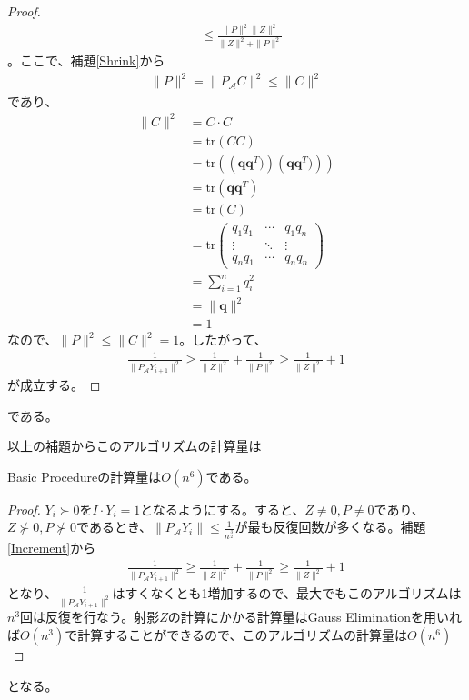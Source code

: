 \begin{proof}
\begin{align*}
                                  & \leq \frac{\|P\|^2 \|Z\|^2}{\|Z\|^2 + \|P\|^2}
  \end{align*}
  。ここで、補題\ref{Shrink}から
  \begin{align*}
    \|P\|^2 = \|P_\mathcal{A} C\|^2 \leq \|C\|^2
  \end{align*}
  であり、
  \begin{align*}
    \|C\|^2 & = C \cdot C \\
            & = \mathrm{tr} \left(C C\right) \\
            & = \mathrm{tr} \left(\left(\mathbf{q} \mathbf{q}^T)\right) \left(\mathbf{q} \mathbf{q}^T)\right)\right) \\
            & = \mathrm{tr} \left(\mathbf{q} \mathbf{q}^T\right) \\
            & = \mathrm{tr} \left(C\right) \\
            & = \mathrm{tr} \left(
                              \begin{array}{ccc}
                                q_1 q_1 & \cdots & q_1 q_n \\
                                \vdots  & \ddots & \vdots \\
                                q_n q_1 & \cdots & q_n q_n
                              \end{array}
                            \right) \\
            & = \displaystyle{\sum_{i = 1}^n} q_i^2 \\
            & = \|\mathbf{q}\|^2 \\
            & = 1
  \end{align*}
  なので、$\|P\|^2 \leq \|C\|^2 = 1$。したがって、
  \begin{align*}
    \frac{1}{\|P_\mathcal{A} Y_{i + 1}\|^2} \geq \frac{1}{\|Z\|^2} + \frac{1}{\|P\|^2} \geq \frac{1}{\|Z\|^2} + 1
  \end{align*}
  が成立する。
\end{proof}
である。

以上の補題からこのアルゴリズムの計算量は
\begin{theorem} \label{BasicProcedureOrder}
  Basic Procedureの計算量は$O (n^6)$である。
\end{theorem}
\begin{proof}
  $Y_i \succ 0$を$I \cdot Y_i = 1$となるようにする。すると、$Z \not= 0, P \not= 0$であり、$Z \not\succ 0, P \not\succ 0$であるとき、$\|P_\mathcal{A} Y_i\| \leq \displaystyle{\frac{1}{n^\frac{3}{2}}}$が最も反復回数が多くなる。補題\ref{Increment}から
  \begin{align*}
    \frac{1}{\|P_\mathcal{A} Y_{i + 1}\|^2} \geq \frac{1}{\|Z\|^2} + \frac{1}{\|P\|^2} \geq \frac{1}{\|Z\|^2} + 1
  \end{align*}
  となり、$\displaystyle{\frac{1}{\|P_\mathcal{A} Y_{i + 1}\|^2}}$はすくなくとも1増加するので、最大でもこのアルゴリズムは$n^3$回は反復を行なう。射影$Z$の計算にかかる計算量はGauss Eliminationを用いれば$O (n^3)$で計算することができるので、このアルゴリズムの計算量は$O(n^6)$
\end{proof}
となる。


